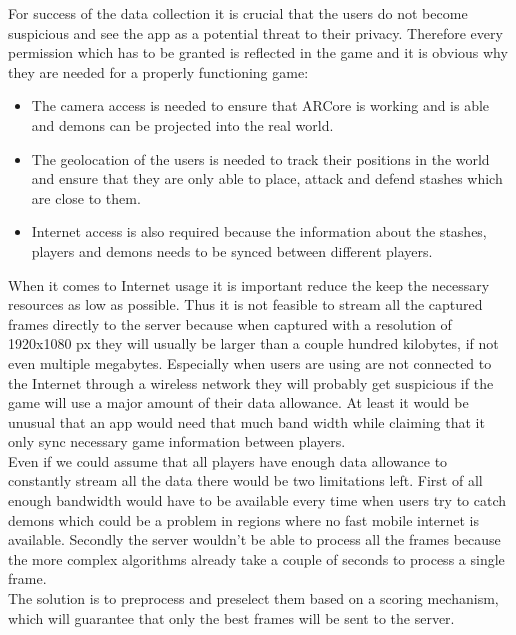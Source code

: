 For success of the data collection it is crucial that the users do not become suspicious and see the app as a potential threat to their privacy.
Therefore every permission which has to be granted is reflected in the game and it is obvious why they are needed for a properly functioning game:
\begin{itemize}
    \item The camera access is needed to ensure that ARCore is working and is able and demons can be projected into the real world.
    \item The geolocation of the users is needed to track their positions in the world and ensure that they are only able to place, attack and defend stashes which are close to them.
    \item Internet access is also required because the information about the stashes, players and demons needs to be synced between different players.
\end{itemize}

 

When it comes to Internet usage it is important reduce the keep the necessary resources as low as possible. 
Thus it is not feasible to stream all the captured frames directly to the server because when captured with a resolution of 1920x1080 px they will usually be larger than a couple hundred kilobytes, if not even multiple megabytes.
Especially when users are using are not connected to the Internet through a wireless network they will probably get suspicious if the game will use a major amount of their data allowance.
At least it would be unusual that an app would need that much band width while claiming that it only sync necessary game information between players.\\
Even if we could assume that all players have enough data allowance to constantly stream all the data there would be two limitations left.
First of all enough bandwidth would have to be available every time when users try to catch demons which could be a problem in regions where no fast mobile internet is available.
Secondly the server wouldn't be able to process all the frames because the more complex algorithms already take a couple of seconds to process a single frame. \\
The solution is to preprocess and preselect them based on a scoring mechanism, which will guarantee that only the best frames will be sent to the server.

